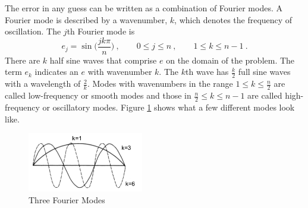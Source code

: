 The error in any guess can be written as a combination of Fourier modes. A Fourier mode is described by a wavenumber, $k$, which denotes the frequency of oscillation. The $j$th Fourier mode is 
% 
\begin{equation}
    e_{j} = \sin\bigl(\frac{jk\pi}{n}\bigr) \:, \qquad 0 \le j \le n \:, \qquad 1 \le k \le n-1 \:.
\end{equation} 
%
There are $k$ half sine waves that comprise $e$ on the domain of the problem. The term $e_{k}$ indicates an $e$ with wavenumber $k$. The $k$th wave has $\frac{k}{2}$ full sine waves with a wavelength of $\frac{2}{k}$. Modes with wavenumbers in the range $1 \le k \le \frac{n}{2}$ are called low-frequency or smooth modes and those in $\frac{n}{2} \le k \le n-1$ are called high-frequency or oscillatory modes. Figure \ref{fig:FourierModes} shows what a few different modes look like. 
%
\begin{figure}[!ht]
    \begin{center}
      \includegraphics [width=0.45\textwidth, height=0.2\textheight] {FourierModes}
   \end{center}
   \caption{Three Fourier Modes \cite{Briggs2000}}
   \label{fig:FourierModes}
\end{figure}


